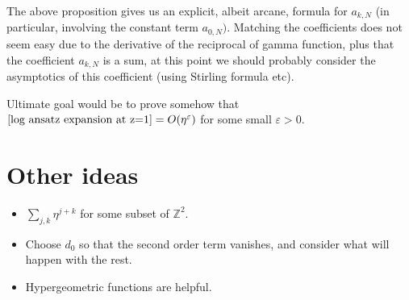 \documentclass[12pt]{article}
\theoremstyle{plain}
\begin{document}
The above proposition gives us an explicit, albeit arcane, formula for $a_{k,N}$ (in particular, involving the constant term $a_{0, N})$. Matching the coefficients does not seem easy due to the derivative of the reciprocal of gamma function, plus that the coefficient $a_{k,N}$ is a sum, at this point we should probably consider the asymptotics of this coefficient (using Stirling formula etc).

Ultimate goal would be to prove somehow that $\eqref{log ansatz expansion at z=1} = O(\eta^\varepsilon)$ for some small $\varepsilon>0$.

\section{Other ideas}

\begin{itemize}
    \item $\sum _{j,k} \eta ^{j+k} $ for some subset of $\mathbb Z^2$.
    \item Choose $d_0$ so that the second order term vanishes, and consider what will happen with the rest.
    \item Hypergeometric functions are helpful.
\end{itemize}

\newpage

\printbibliography
\end{document}
